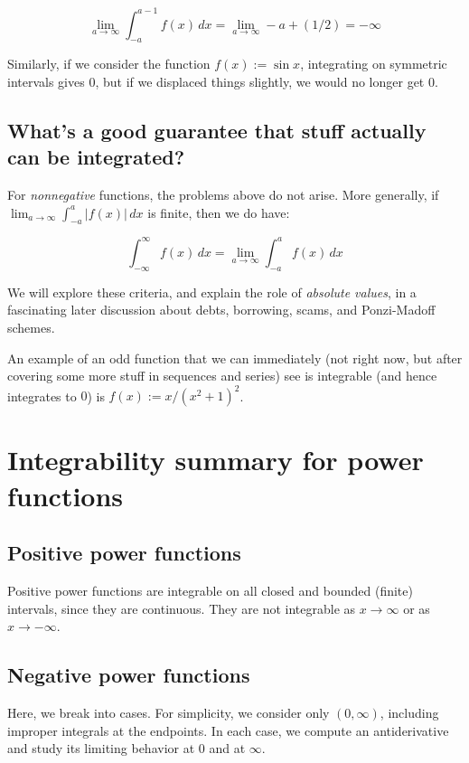 \documentclass[10pt]{amsart}
\begin{document}
$$\lim_{a \to \infty} \int_{-a}^{a - 1} f(x) \, dx = \lim_{a \to \infty} -a + (1/2) = -\infty$$

Similarly, if we consider the function $f(x) := \sin x$, integrating
on symmetric intervals gives $0$, but if we displaced things slightly,
we would no longer get $0$.

\subsection{What's a good guarantee that stuff actually can be integrated?}

For {\em nonnegative} functions, the problems above do not arise. More
generally, if $\lim_{a \to \infty} \int_{-a}^a |f(x)| \, dx$ is
finite, then we do have:

$$\int_{-\infty}^\infty f(x) \, dx = \lim_{a \to \infty} \int_{-a}^a f(x) \, dx$$

We will explore these criteria, and explain the role of {\em absolute
values}, in a fascinating later discussion about debts, borrowing,
scams, and Ponzi-Madoff schemes.

An example of an odd function that we can immediately (not right now,
but after covering some more stuff in sequences and series) see is
integrable (and hence integrates to $0$) is $f(x) := x/(x^2 + 1)^2$.

\section{Integrability summary for power functions}

\subsection{Positive power functions}

Positive power functions are integrable on all closed and bounded
(finite) intervals, since they are continuous. They are not integrable
as $x \to \infty$ or as $x \to -\infty$.

\subsection{Negative power functions}

Here, we break into cases. For simplicity, we consider only
$(0,\infty)$, including improper integrals at the endpoints. In each
case, we compute an antiderivative and study its limiting behavior at
$0$ and at $\infty$.
\end{document}
